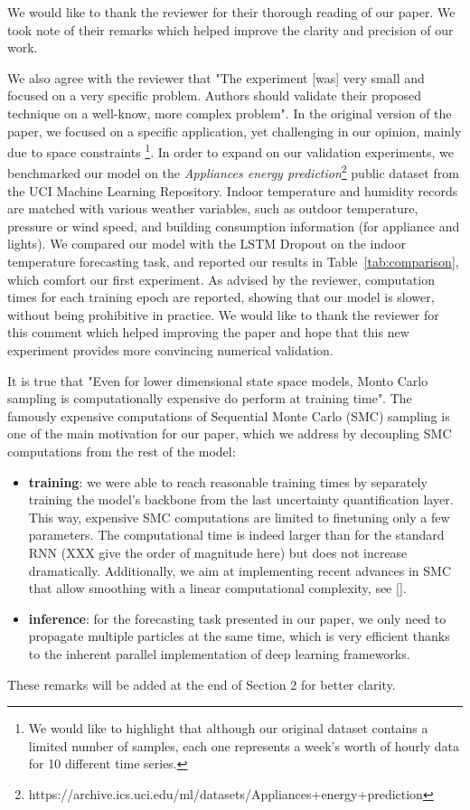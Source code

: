 \documentclass{article}
\title{}
\author{}
\date{}
\begin{document}
\maketitle

We would like to thank the reviewer for their thorough reading of our paper.
We took note of their remarks which helped improve the clarity and precision of our work.

We also agree with the reviewer that "The experiment [was] very small and focused on a very specific problem. Authors should validate their proposed technique on a well-know, more complex problem".
In the original version of the paper, we focused on a specific application, yet challenging in our opinion, mainly due to space constraints \footnote{We would like to highlight that although our original dataset contains a limited number of samples, each one represents a week's worth of hourly data for 10 different time series.}.
In order to expand on our validation experiments, we benchmarked our model on the \textit{Appliances energy prediction}\footnote{https://archive.ics.uci.edu/ml/datasets/Appliances+energy+prediction} public dataset from the UCI Machine Learning Repository.
Indoor temperature and humidity records are matched with various weather variables, such as outdoor temperature, pressure or wind speed, and building consumption information (for appliance and lights).
We compared our model with the LSTM Dropout on the indoor temperature forecasting task, and reported our results in Table~\ref{tab:comparison}, which comfort our first experiment.
As advised by the reviewer, computation times for each training epoch are reported, showing that our model is slower, without being prohibitive in practice.
We would like to thank the reviewer for this comment which helped improving the paper and hope that this new experiment provides more convincing numerical validation.

It is true that  "Even for lower dimensional state space models, Monto Carlo sampling is computationally expensive do perform at training time".
The famously expensive computations of Sequential Monte Carlo (SMC) sampling is one of the main motivation for our paper, which we address by decoupling SMC computations from the rest of the model:
\begin{itemize}
	\item \textbf{training}: we were able to reach reasonable training times by separately training the model's backbone from the last uncertainty quantification layer.
	      This way, expensive SMC computations are limited to finetuning only a few parameters.
	      The computational time is indeed larger than for the standard RNN (XXX give the order of magnitude here) but does not increase dramatically.
	      Additionally, we aim at implementing recent advances in SMC that allow smoothing with a linear computational complexity, see [].
	\item \textbf{inference}: for the forecasting task presented in our paper, we only need to propagate multiple particles at the same time, which is very efficient thanks to the inherent parallel implementation of deep learning frameworks.
\end{itemize}
These remarks will be added at the end of Section 2 for better clarity.
\end{document}
